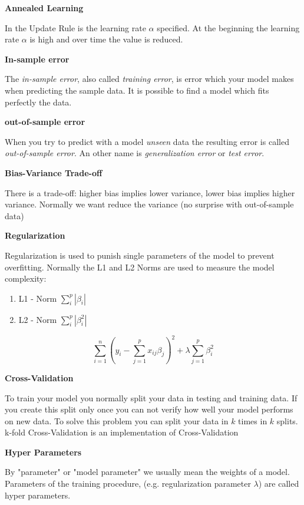 \documentclass[11pt,landscape]{article}
\begin{document}
\begin{multicols}{3}
\textbf{Annealed Learning}

In the Update Rule is the learning rate \(\alpha\) specified.
At the beginning the learning rate \(\alpha\) is high and over time the value is reduced.


\textbf{In-sample error}

The \emph{in-sample error}, also called \emph{training error}, is error which your model makes when predicting the sample data.
It is possible to find a model which fits perfectly the data.

\textbf{out-of-sample error}

When you try to predict with a model \emph{unseen} data the resulting error is called \emph{out-of-sample error}.
An other name is \emph{generalization error} or \emph{test error}.


\textbf{Bias-Variance Trade-off}

There is a trade-off: higher bias implies lower variance, lower bias implies higher variance.
Normally we want reduce the variance (no surprise with out-of-sample data)


\textbf{Regularization}

Regularization is used to punish single parameters of the model to prevent overfitting.
Normally the L1 and L2 Norms are used to measure the model complexity:
\begin{enumerate}
\item L1 - Norm \(\sum_i^p |\beta_i|\)
\item L2 - Norm \(\sum_i^p |\beta_i^2|\)
\end{enumerate}

\begin{equation}
  \sum_{i=1}^n(y_i - \sum_{j=1}^p x_{ij}\beta_j)^2 + \lambda \sum_{j=1}^p\beta_i^2
\end{equation}


\textbf{Cross-Validation}

To train your model you normally split your data in testing and training data.
If you create this split only once you can not verify how well your model performs on new data.
To solve this problem you can split your data in \(k\) times in \(k\) splits.
k-fold Cross-Validation is an implementation of Cross-Validation


\textbf{Hyper Parameters}

By "parameter" or "model parameter" we usually mean the weights of a model.
Parameters of the training procedure, (e.g. regularization parameter \(\lambda\)) are called hyper parameters.


\end{multicols}
\end{document}

